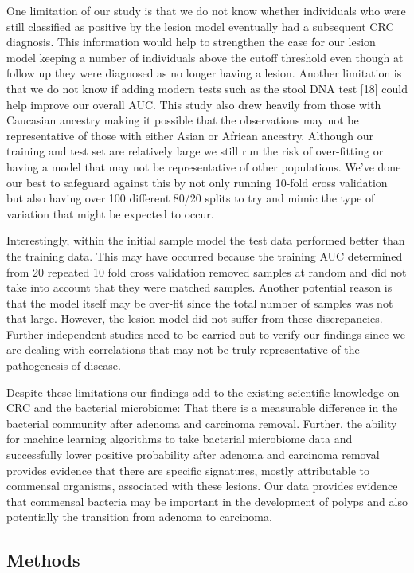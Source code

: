 \documentclass[12pt,]{article}
\begin{document}
One limitation of our study is that we do not know whether individuals
who were still classified as positive by the lesion model eventually had
a subsequent CRC diagnosis. This information would help to strengthen
the case for our lesion model keeping a number of individuals above the
cutoff threshold even though at follow up they were diagnosed as no
longer having a lesion. Another limitation is that we do not know if
adding modern tests such as the stool DNA test {[}18{]} could help
improve our overall AUC. This study also drew heavily from those with
Caucasian ancestry making it possible that the observations may not be
representative of those with either Asian or African ancestry. Although
our training and test set are relatively large we still run the risk of
over-fitting or having a model that may not be representative of other
populations. We've done our best to safeguard against this by not only
running 10-fold cross validation but also having over 100 different
80/20 splits to try and mimic the type of variation that might be
expected to occur.

Interestingly, within the initial sample model the test data performed
better than the training data. This may have occurred because the
training AUC determined from 20 repeated 10 fold cross validation
removed samples at random and did not take into account that they were
matched samples. Another potential reason is that the model itself may
be over-fit since the total number of samples was not that large.
However, the lesion model did not suffer from these discrepancies.
Further independent studies need to be carried out to verify our
findings since we are dealing with correlations that may not be truly
representative of the pathogenesis of disease.

Despite these limitations our findings add to the existing scientific
knowledge on CRC and the bacterial microbiome: That there is a
measurable difference in the bacterial community after adenoma and
carcinoma removal. Further, the ability for machine learning algorithms
to take bacterial microbiome data and successfully lower positive
probability after adenoma and carcinoma removal provides evidence that
there are specific signatures, mostly attributable to commensal
organisms, associated with these lesions. Our data provides evidence
that commensal bacteria may be important in the development of polyps
and also potentially the transition from adenoma to carcinoma.

\newpage

\subsection{Methods}\label{methods}
\end{document}
